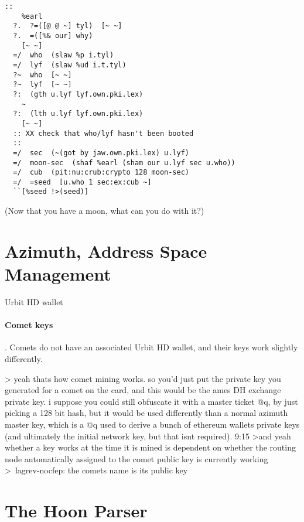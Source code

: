 \begin{lstlisting}
::
    %earl
  ?.  ?=([@ @ ~] tyl)  [~ ~]
  ?.  =([%& our] why)
    [~ ~]
  =/  who  (slaw %p i.tyl)
  =/  lyf  (slaw %ud i.t.tyl)
  ?~  who  [~ ~]
  ?~  lyf  [~ ~]
  ?:  (gth u.lyf lyf.own.pki.lex)
    ~
  ?:  (lth u.lyf lyf.own.pki.lex)
    [~ ~]
  :: XX check that who/lyf hasn't been booted
  ::
  =/  sec  (~(got by jaw.own.pki.lex) u.lyf)
  =/  moon-sec  (shaf %earl (sham our u.lyf sec u.who))
  =/  cub  (pit:nu:crub:crypto 128 moon-sec)
  =/  =seed  [u.who 1 sec:ex:cub ~]
  ``[%seed !>(seed)]
\end{lstlisting}

(Now that you have a moon, what can you do with it?)


\section[Azimuth]{Azimuth, Address Space Management}

Urbit HD wallet


\paragraph{Comet keys}.  Comets do not have an associated Urbit HD wallet, and their keys work slightly differently.

> yeah thats how comet mining works. so you'd just put the private key you generated for a comet on the card, and this would be the ames DH exchange private key. i suppose you could still obfuscate it with a master ticket @q, by just picking a 128 bit hash, but it would be used differently than a normal azimuth master key, which is a @q used to derive a bunch of ethereum wallets private keys (and ultimately the initial network key, but that isnt required).
9:15
>and yeah whether a key works at the time it is mined is dependent on whether the routing node automatically assigned to the comet public key is currently working
>~lagrev-nocfep: the comets name is its public key


\section[Hoon Parser]{The Hoon Parser}
